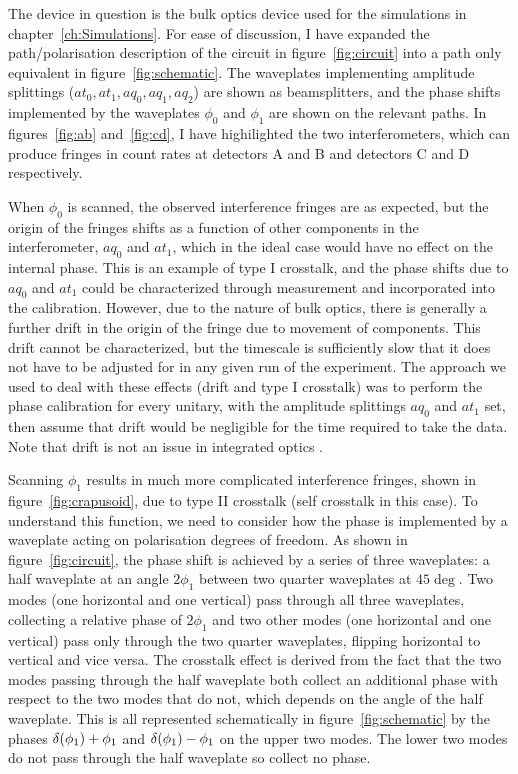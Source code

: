 The device in question is the bulk optics device used for the simulations in
chapter~\ref{ch:Simulations}. For ease of discussion, I have expanded the
path/polarisation description of the circuit in figure~\ref{fig:circuit} into a
path only equivalent in figure~\ref{fig:schematic}. The waveplates implementing
amplitude splittings (\(at_{0}, at_{1}, aq_{0}, aq_{1}, aq_{2}\)) are shown as
beamsplitters, and the phase shifts implemented by the waveplates \(\phi_{0}\)
and \(\phi_{1}\) are shown on the relevant paths. In figures~\ref{fig:ab}
and~\ref{fig:cd}, I have highilighted the two interferometers, which can produce
fringes in count rates at detectors A and B and detectors C and D respectively.

When \(\phi_{0}\) is scanned, the observed interference fringes are as expected,
but the origin of the fringes shifts as a function of other components in the
interferometer, \(aq_{0}\) and \(at_{1}\), which in the ideal case would have no
effect on the internal phase. This is an example of type I crosstalk, and the
phase shifts due to \(aq_{0}\) and \(at_{1}\) could be characterized through
measurement and incorporated into the calibration. However, due to the nature of
bulk optics, there is generally a further drift in the origin of the fringe due
to movement of components. This drift cannot be characterized, but the timescale
is sufficiently slow that it does not have to be adjusted for in any given run
of the experiment. The approach we used to deal with these effects (drift and
type I crosstalk) was to perform the phase calibration for every unitary, with
the amplitude splittings \(aq_{0}\) and \(at_{1}\) set, then assume that drift
would be negligible for the time required to take the data. Note that drift is
not an issue in integrated optics .

Scanning \(\phi_{1}\) results in much more complicated interference fringes,
shown in figure~\ref{fig:crapusoid}, due to type II crosstalk (self crosstalk in
this case). To understand this function, we need to consider how the phase is
implemented by a waveplate acting on polarisation degrees of freedom. As shown
in figure~\ref{fig:circuit}, the phase shift is achieved by a series of three
waveplates: a half waveplate at an angle \(2\phi_{1}\) between two quarter
waveplates at \(45\deg\). Two modes (one horizontal and one vertical) pass
through all three waveplates, collecting a relative phase of \(2\phi_{1}\) and
two other modes (one horizontal and one vertical) pass only through the two
quarter waveplates, flipping horizontal to vertical and vice versa. The
crosstalk effect is derived from the fact that the two modes passing through the
half waveplate both collect an additional phase with respect to the two modes
that do not, which depends on the angle of the half waveplate. This is all
represented schematically in figure~\ref{fig:schematic} by the phases \(\delta
\!\left(\phi_{1}\right) + \phi_{1}\) and \(\delta \!\left(\phi_{1}\right) - \phi_{1}\) on the upper
two modes. The lower two modes do not pass through the half waveplate so collect
no phase.

